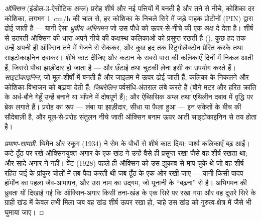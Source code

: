 \begin{proposition}[ऑक्सिन और शीर्ष प्रभाविता]\label{prop:b2:plant-meristems:apical}
\emph{ऑक्सिन} (इंडोल-3-ऐसीटिक अम्ल) प्ररोह शीर्ष और नई पत्तियों में
बनती है और तने से नीचे, कोशिका दर कोशिका, लगभग
\qty{1}{cm/h} की चाल से, हर कोशिका के निचले सिरे में जड़े वाहक प्रोटीनों
(PIN) द्वारा ढोई जाती है --- यानी ऐसा \emph{ध्रुवीय अभिगमन} जो उस पौधे
को ऊपर-से-नीचे की एक अक्ष दे देता है। शीर्ष से उतरती ऑक्सिन की धारा
अपने नीचे की कक्षस्थ कलिकाओं को प्रसुप्त रखती है (\emph{}),
कुछ हद तक उन्हें अपनी ही ऑक्सिन तने में भेजने से रोककर,
और कुछ हद तक स्ट्रिगोलैक्टोन प्रेरित करके तथा साइटोकाइनिन दबाकर।
शीर्ष काट दीजिए और कटान के सबसे पास की कलिकाएँ दिनों में निकल आती हैं,
जिससे पौधा झाड़ीदार हो जाता है --- और छँटाई तथा चुटकी लेना इसी का उपयोग
करते हैं। \emph{साइटोकाइनिन}, जो मूल-शीर्षों में बनती हैं और जाइलम में
ऊपर ढोई जाती हैं, कलिका के निकलने और कोशिका-विभाजन को बढ़ावा देती हैं;
\emph{जिबरेलिन} पर्वसंधि-अंतराल लंबे करते हैं (बौने मटर और हरित क्रांति
के अर्ध-बौने गेहूँ उन्हें बनाने या भाँपने में दोषपूर्ण हैं); और ऐब्सिसिक
अम्ल तथा एथिलीन दबाव में वृद्धि पर ब्रेक लगाते हैं। प्ररोह का रूप ---
लंबा या झाड़ीदार, सीधा या फैला हुआ --- इन संकेतों के बीच की सौदेबाज़ी है,
और मूल-से-प्ररोह संतुलन नीचे जाती ऑक्सिन बनाम ऊपर आती साइटोकाइनिन से तय होता है।
\end{proposition}
\begin{proof}[प्रमाण-सामग्री]
थिमैन और स्कूग (1934) ने सेम के पौधों से शीर्ष काट दिया: पार्श्व
कलिकाएँ बढ़ आईं। कटे ठूँठ पर रखे ऑक्सिनयुक्त अगार के एक खंड ने उन्हें
वैसे ही प्रसुप्त रखा जैसे वह शीर्ष रखता था; और सादे अगार ने नहीं। वेंट
(1928) पहले ही ऑक्सिन को उस झुकाव से माप चुके थे जो वह शीर्ष-रहित जई के
प्रांकुर-चोलों में तब पैदा करती थी जब ठूँठ के एक ओर रखी जाए ---
यानी किसी पादप हॉर्मोन का पहला जैव-आमापन, और उस नाम का उद्गम, जो
यूनानी के ``बढ़ना'' से है। अभिगमन की ध्रुवता यों दिखाई गई
कि ऑक्सिन-अगार किसी तना-खंड के एक सिरे पर रखा गया और वह दूसरे सिरे के
ग्राही खंड में केवल तभी मिला जब वह खंड शीर्ष ऊपर रखा हो, चाहे उस खंड को
गुरुत्व-क्षेत्र में जैसे भी घुमाया जाए।
\end{proof}

